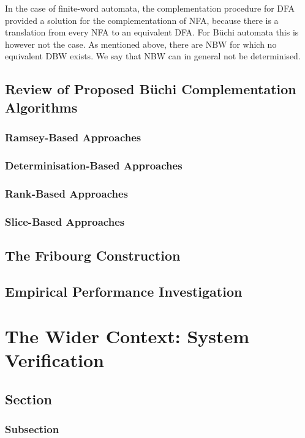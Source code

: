 \documentclass{scrreprt}
\begin{document}
In the case of finite-word automata, the complementation procedure for DFA provided a solution for the complementationn of NFA, because there is a translation from every NFA to an equivalent DFA. For Büchi automata this is however not the case. As mentioned above, there are NBW for which no equivalent DBW exists. We say that NBW can in general not be determinised.

\section{Review of Proposed Büchi Complementation Algorithms}
\subsection{Ramsey-Based Approaches}
\subsection{Determinisation-Based Approaches}
\subsection{Rank-Based Approaches}
\subsection{Slice-Based Approaches}

\section{The Fribourg Construction}

\section{Empirical Performance Investigation}




\chapter{The Wider Context: System Verification}
\section{Section} %
\subsection{Subsection} %
\end{document}

